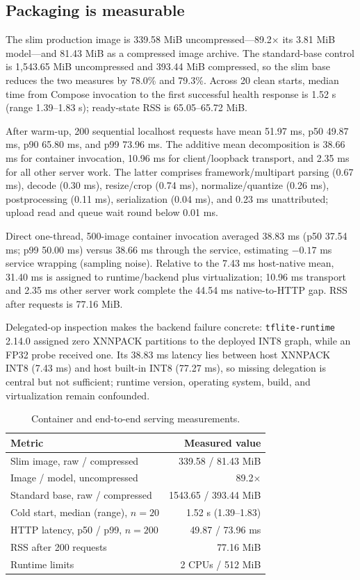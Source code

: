 \subsection{Packaging is measurable}
\label{sec:packaging-results}

The slim production image is 339.58 MiB uncompressed---89.2$\times$ its 3.81 MiB model---and 81.43 MiB as a compressed image archive. The standard-base control is 1,543.65 MiB uncompressed and 393.44 MiB compressed, so the slim base reduces the two measures by 78.0\% and 79.3\%. Across 20 clean starts, median time from Compose invocation to the first successful health response is 1.52 s (range 1.39--1.83 s); ready-state RSS is 65.05--65.72 MiB.

After warm-up, 200 sequential localhost requests have mean 51.97 ms, p50 49.87 ms, p90 65.80 ms, and p99 73.96 ms. The additive mean decomposition is 38.66 ms for container invocation, 10.96 ms for client/loopback transport, and 2.35 ms for all other server work. The latter comprises framework/multipart parsing (0.67 ms), decode (0.30 ms), resize/crop (0.74 ms), normalize/quantize (0.26 ms), postprocessing (0.11 ms), serialization (0.04 ms), and 0.23 ms unattributed; upload read and queue wait round below 0.01 ms.

Direct one-thread, 500-image container invocation averaged 38.83 ms (p50 37.54 ms; p99 50.00 ms) versus 38.66 ms through the service, estimating $-0.17$ ms service wrapping (sampling noise). Relative to the 7.43 ms host-native mean, 31.40 ms is assigned to runtime/backend plus virtualization; 10.96 ms transport and 2.35 ms other server work complete the 44.54 ms native-to-HTTP gap. RSS after requests is 77.16 MiB.

Delegated-op inspection makes the backend failure concrete: \texttt{tflite-runtime} 2.14.0 assigned zero XNNPACK partitions to the deployed INT8 graph, while an FP32 probe received one. Its 38.83 ms latency lies between host XNNPACK INT8 (7.43 ms) and host built-in INT8 (77.27 ms), so missing delegation is central but not sufficient; runtime version, operating system, build, and virtualization remain confounded.

\begin{table}[t]
\centering
\caption{Container and end-to-end serving measurements.}
\label{tab:packaging}
\setlength{\tabcolsep}{5pt}
\begin{tabular}{lr}
\toprule
\textbf{Metric} & \textbf{Measured value}\\
\midrule
Slim image, raw / compressed & 339.58 / 81.43 MiB\\
Image / model, uncompressed & 89.2$\times$\\
Standard base, raw / compressed & 1543.65 / 393.44 MiB\\
Cold start, median (range), $n=20$ & 1.52 s (1.39--1.83)\\
HTTP latency, p50 / p99, $n=200$ & 49.87 / 73.96 ms\\
RSS after 200 requests & 77.16 MiB\\
Runtime limits & 2 CPUs / 512 MiB\\
\bottomrule
\end{tabular}
\end{table}

